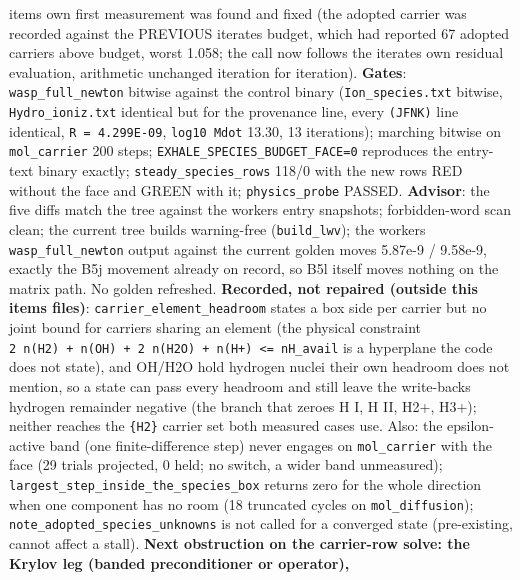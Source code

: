 \documentclass[english,a4paper]{my_memo}
\begin{document}
\begin{itemize}
  item\textquotesingle s own first measurement was found and fixed (the adopted carrier
  was recorded against the PREVIOUS iterate\textquotesingle s budget, which had reported 67
  adopted carriers above budget, worst 1.058; the call now follows the
  iterate\textquotesingle s own residual evaluation, arithmetic unchanged iteration for
  iteration). \textbf{Gates}: \texttt{wasp\_full\_newton} bitwise against the control
  binary (\texttt{Ion\_species.txt} bitwise, \texttt{Hydro\_ioniz.txt} identical but for
  the provenance line, every \texttt{(JFNK)} line identical, \texttt{\textbar{}\textbar{}R\textbar{}\textbar{}\ =\ 4.299E-09},
  \texttt{log10\ Mdot} 13.30, 13 iterations); marching bitwise on \texttt{mol\_carrier} 200
  steps; \texttt{EXHALE\_SPECIES\_BUDGET\_FACE=0} reproduces the entry-text binary
  exactly; \texttt{steady\_species\_rows} 118/0 with the new rows RED without the
  face and GREEN with it; \texttt{physics\_probe} PASSED. \textbf{Advisor}: the five
  diffs match the tree against the worker\textquotesingle s entry snapshots; forbidden-word
  scan clean; the current tree builds warning-free (\texttt{build\_lwv}); the
  worker\textquotesingle s \texttt{wasp\_full\_newton} output against the current golden moves
  5.87e-9 / 9.58e-9, exactly the B5j movement already on record, so B5l
  itself moves nothing on the matrix path. No golden refreshed. \textbf{Recorded,
  not repaired (outside this item\textquotesingle s files)}: \texttt{carrier\_element\_headroom}
  states a box side per carrier but no joint bound for carriers sharing an
  element (the physical constraint \texttt{2\ n(H2)\ +\ n(OH)\ +\ 2\ n(H2O)\ +\ n(H+)\ \textless{}=\ nH\_avail} is a hyperplane the code does not state), and OH/H2O hold
  hydrogen nuclei their own headroom does not mention, so a state can pass
  every headroom and still leave the write-back\textquotesingle s hydrogen remainder
  negative (the branch that zeroes H I, H II, H2+, H3+); neither reaches
  the \texttt{\{H2\}} carrier set both measured cases use. Also: the epsilon-active
  band (one finite-difference step) never engages on \texttt{mol\_carrier} with the
  face (29 trials projected, 0 held; no switch, a wider band unmeasured);
  \texttt{largest\_step\_inside\_the\_species\_box} returns zero for the whole
  direction when one component has no room (18 truncated cycles on
  \texttt{mol\_diffusion}); \texttt{note\_adopted\_species\_unknowns} is not called for a
  converged state (pre-existing, cannot affect a stall). \textbf{Next obstruction
  on the carrier-row solve: the Krylov leg (banded preconditioner or operator),
}
\end{itemize}
\end{document}
